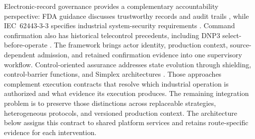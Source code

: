 Electronic-record governance provides a complementary accountability
perspective: FDA guidance discusses trustworthy records and audit trails
\cite{part11}, while IEC~62443-3-3 specifies industrial system-security
requirements \cite{iec62443-3-3}. Command confirmation also has historical
telecontrol precedents, including DNP3 select-before-operate
\cite{ieee1815dnp3}. The framework brings actor identity, production context,
source-dependent admission, and retained confirmation evidence into one
supervisory workflow. Control-oriented assurance addresses state evolution
through shielding, control-barrier functions, and Simplex architectures
\cite{alshiekh2018shielding,ames2017cbf,sha2001simplex}. Those approaches
complement execution contracts that resolve which industrial operation is
authorized and what evidence its execution produces. The remaining
integration problem is to preserve those distinctions across replaceable
strategies, heterogeneous protocols, and versioned production context.
The architecture below assigns this contract to shared platform services
and retains route-specific evidence for each intervention.
